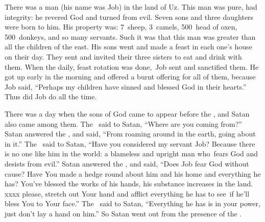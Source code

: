 
\begin{inparaenum}
   There was a man (his name was Job) in the land of Uz. This man was pure, had integrity: he revered God and turned from evil.%
   Seven sons and three daughters were born to him.%
   His property was: 7~sheep, 3~camels, 500~head of oxen, 500~donkeys, and so many servants. Such it was that this man was greater than all the children of the east.%
   His sons went and made a feast in each one's house on their day. They sent and invited their three sisters to eat and drink with them.%
   When the daily, feast rotation was done,\understood{}\ Job sent and sanctified them. He got up early in the morning and offered a burnt offering for all of them, because Job said, ``Perhaps my children have sinned and blessed God in their hearts.'' Thus did Job do all the time.%

   There was a day when the sons of God came to appear before the \lord, and Satan also came among them.%
   The \lord\ said to Satan, ``Where are you coming from?'' Satan answered the \lord, and said, ``From roaming around in the earth, going about in it.''%
   The \lord\ said to Satan, ``Have you considered my servant Job? Because there is no one like him in the world: a blameless and upright man who\understood{}\ fears God and desists from evil.''%
   Satan answered the \lord, and said, ``Does Job fear God without cause?%
   Have You made a hedge round about him and his home and everything he has? You've blessed the works of his hands, his substance increases in the land.%
   xxxx please, stretch out Your hand and afflict everything he has to see\understood{}\ if he'll bless You to Your face.''%
   The \lord\ said to Satan, ``Everything he has is in your power, just don't lay a hand on him.'' So Satan went out from the presence of the \lord.%


\end{inparaenum}
